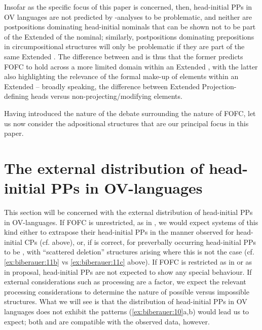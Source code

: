 \documentclass[output=paper]{LSP/langsci}
\begin{document}
Insofar as the specific focus of this paper is concerned, then, head-initial PPs in OV languages are not predicted by -analyses to be problematic, and neither are postpositions dominating head-initial nominals that can be shown not to be part of the Extended  of the nominal; similarly, postpositions dominating prepositions in circumpositional structures will only be problematic if they are part of the same Extended . The difference between  and  is thus that the former predicts FOFC to hold across a more limited domain within an Extended , with the latter also highlighting the relevance of the formal make-up of elements within an Extended  – broadly speaking, the difference between Extended Projection-defining heads versus non-projecting/modifying elements.

Having introduced the nature of the debate surrounding the nature of FOFC, let us now consider the adpositional structures that are our principal focus in this paper. 

\section{The external distribution of head-initial PPs in OV-languages}\label{sec:biberauer:3}

This section will be concerned with the external distribution of head-initial PPs in OV-languages. If FOFC is unrestricted, as in , we would expect systems of this kind either to extrapose their head-initial PPs in the manner observed for head-initial CPs (cf.  above), or, if \citet{Sheehan2013fofc} is correct, for preverbally occurring head-initial PPs to be , with “scattered deletion” structures arising where this is not the case (cf. \ref{ex:biberauer:11b} vs \ref{ex:biberauer:11c} above). If FOFC is restricted as in  or as in  proposal, head-initial PPs are not expected to show any special behaviour. If external considerations such as processing are a factor, we expect the relevant processing considerations to determine the nature of possible versus impossible structures. What we will see is that the distribution of head-initial PPs in OV languages does not exhibit the patterns (\ref{ex:biberauer:10}a,b) would lead us to expect; both  and  are compatible with the observed data, however.
\end{document}
